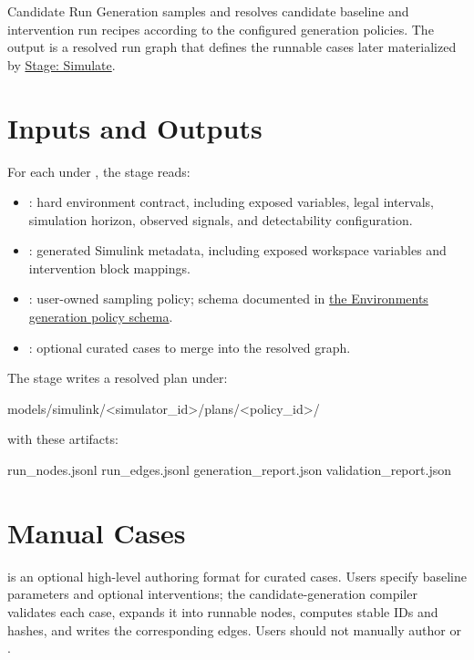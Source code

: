 \documentclass[11pt]{article}
\begin{document}
\label{docstart:candidate_generation}
Candidate Run Generation samples and resolves candidate baseline and intervention run recipes according to the configured generation policies.
The output is a resolved run graph that defines the runnable cases later materialized by \hyperref[docstart:simulation_stage]{Stage: Simulate}.

\section*{Inputs and Outputs}

For each \termSimulator{} under , the stage reads:

\begin{itemize}
\item {}: hard environment contract, including exposed variables, legal intervals, simulation horizon, observed signals, and detectability configuration.
\item {}: generated Simulink metadata, including exposed workspace variables and intervention block mappings.
\item {}: user-owned sampling policy; schema documented in \hyperref[sec:generation-policy-schema]{the Environments generation policy schema}.
\item {}: optional curated cases to merge into the resolved graph.
\end{itemize}

The stage writes a resolved plan under:

\begin{DocCode}
models/simulink/<simulator_id>/plans/<policy_id>/
\end{DocCode}

with these artifacts:

\begin{DocCode}
run_nodes.jsonl
run_edges.jsonl
generation_report.json
validation_report.json
\end{DocCode}

\section*{Manual Cases}

 is an optional high-level authoring format for curated cases. Users specify baseline parameters and optional interventions; the candidate-generation compiler validates each case, expands it into runnable nodes, computes stable IDs and hashes, and writes the corresponding edges. Users should not manually author  or .
\end{document}

